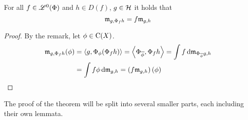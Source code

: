 \begin{lem} \label{lemlinm}
 
  For all $f \in \mathscr{L}^0(\Phi)$ and $h \in D(f)$, $g\in \mathcal{H}$ it holds that
 \[
 \mathfrak{m}_{g, \Phi_f h} = f\mathfrak{m}_{g,h}
 \]

\end{lem}

\begin{proof}
 By the remark, let $\phi \in \operatorname{C}(X)$.
 \begin{align*}
   \mathfrak{m}_{g, \Phi_f h}(\phi) &= \left\langle g, \Phi_\phi (\Phi_f h) \right\rangle 
			  = \left\langle \Phi_{\overline{\phi}} , \Phi_f h \right\rangle
			  = \int f \operatorname{d}\! \mathfrak{m}_{\Phi_{\overline{\phi}} g, h}\\
			  &= \int f \phi \operatorname{d}\! \mathfrak{m}_{g,h}
			  = \left( f \mathfrak{m}_{g,h} \right)(\phi)
 \end{align*}

\end{proof}


The proof of the theorem will be split into several smaller parts, each including their own lemmata.


